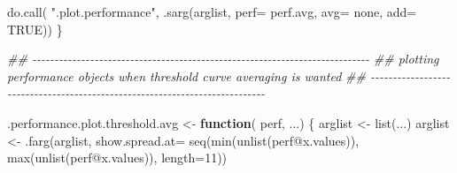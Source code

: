 \documentclass[
  letterpaper,
  DIV=11,
  numbers=noendperiod]{scrartcl}
\newenvironment{Shaded}{\begin{snugshade}}{\end{snugshade}}
\newcommand{\AttributeTok}[1]{\textcolor[rgb]{0.40,0.45,0.13}{#1}}
\newcommand{\ConstantTok}[1]{\textcolor[rgb]{0.56,0.35,0.01}{#1}}
\newcommand{\ControlFlowTok}[1]{\textcolor[rgb]{0.00,0.23,0.31}{\textbf{#1}}}
\newcommand{\DecValTok}[1]{\textcolor[rgb]{0.68,0.00,0.00}{#1}}
\newcommand{\DocumentationTok}[1]{\textcolor[rgb]{0.37,0.37,0.37}{\textit{#1}}}
\newcommand{\FunctionTok}[1]{\textcolor[rgb]{0.28,0.35,0.67}{#1}}
\newcommand{\NormalTok}[1]{\textcolor[rgb]{0.00,0.23,0.31}{#1}}
\newcommand{\OtherTok}[1]{\textcolor[rgb]{0.00,0.23,0.31}{#1}}
\newcommand{\SpecialCharTok}[1]{\textcolor[rgb]{0.37,0.37,0.37}{#1}}
\newcommand{\StringTok}[1]{\textcolor[rgb]{0.13,0.47,0.30}{#1}}
\begin{document}
\begin{Shaded}
\begin{Highlighting}[]
    \FunctionTok{do.call}\NormalTok{( }\StringTok{".plot.performance"}\NormalTok{, }\FunctionTok{.sarg}\NormalTok{(arglist,}
                                        \AttributeTok{perf=}\NormalTok{ perf.avg,}
                                        \AttributeTok{avg=} \StringTok{\textquotesingle{}none\textquotesingle{}}\NormalTok{,}
                                        \AttributeTok{add=} \ConstantTok{TRUE}\NormalTok{))}
\NormalTok{\}}

\DocumentationTok{\#\# {-}{-}{-}{-}{-}{-}{-}{-}{-}{-}{-}{-}{-}{-}{-}{-}{-}{-}{-}{-}{-}{-}{-}{-}{-}{-}{-}{-}{-}{-}{-}{-}{-}{-}{-}{-}{-}{-}{-}{-}{-}{-}{-}{-}{-}{-}{-}{-}{-}{-}{-}{-}{-}{-}{-}{-}{-}{-}{-}{-}{-}{-}{-}{-}{-}{-}{-}{-}{-}{-}{-}{-}{-}{-}{-}{-}}
\DocumentationTok{\#\# plotting performance objects when threshold curve averaging is wanted}
\DocumentationTok{\#\# {-}{-}{-}{-}{-}{-}{-}{-}{-}{-}{-}{-}{-}{-}{-}{-}{-}{-}{-}{-}{-}{-}{-}{-}{-}{-}{-}{-}{-}{-}{-}{-}{-}{-}{-}{-}{-}{-}{-}{-}{-}{-}{-}{-}{-}{-}{-}{-}{-}{-}{-}{-}{-}{-}{-}{-}{-}{-}{-}{-}{-}{-}{-}{-}{-}{-}{-}{-}{-}{-}{-}{-}{-}{-}{-}{-}}

\NormalTok{.performance.plot.threshold.avg }\OtherTok{\textless{}{-}} \ControlFlowTok{function}\NormalTok{( perf, ...) \{}
\NormalTok{    arglist }\OtherTok{\textless{}{-}} \FunctionTok{list}\NormalTok{(...)}
\NormalTok{    arglist }\OtherTok{\textless{}{-}} \FunctionTok{.farg}\NormalTok{(arglist,}
                     \AttributeTok{show.spread.at=} \FunctionTok{seq}\NormalTok{(}\FunctionTok{min}\NormalTok{(}\FunctionTok{unlist}\NormalTok{(perf}\SpecialCharTok{@}\NormalTok{x.values)),}
                       \FunctionTok{max}\NormalTok{(}\FunctionTok{unlist}\NormalTok{(perf}\SpecialCharTok{@}\NormalTok{x.values)),}
                       \AttributeTok{length=}\DecValTok{11}\NormalTok{))}


\end{Highlighting}
\end{Shaded}
\end{document}
